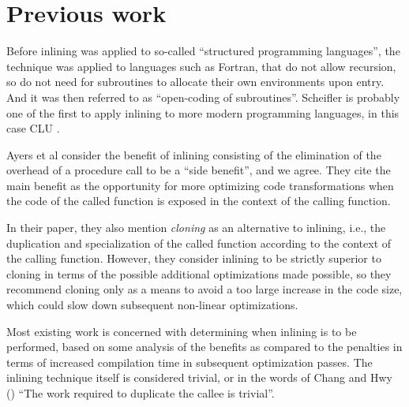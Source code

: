 \section{Previous work}

Before inlining was applied to so-called ``structured programming
languages'', the technique was applied to languages such as Fortran,
that do not allow recursion, so do not need for subroutines to
allocate their own environments upon entry.  And it was then referred
to as ``open-coding of subroutines''.  Scheifler
\cite{Scheifler:1977:AIS:359810.359830} is probably one of the first
to apply inlining to more modern programming languages, in this case
CLU \cite{Liskov:1977:AMC:359763.359789}.

Ayers et al \cite{Ayers:1997:AI:258915.258928} consider the benefit of
inlining consisting of the elimination of the overhead of a procedure
call to be a ``side benefit'', and we agree.  They cite the main
benefit as the opportunity for more optimizing code transformations
when the code of the called function is exposed in the context of the
calling function.

In their paper, they also mention \emph{cloning} as an alternative to
inlining, i.e., the duplication and specialization of the called
function according to the context of the calling function.  However,
they consider inlining to be strictly superior to cloning in terms of
the possible additional optimizations made possible, so they recommend
cloning only as a means to avoid a too large increase in the code
size, which could slow down subsequent non-linear optimizations.

Most existing work is concerned with determining when inlining is to
be performed, based on some analysis of the benefits as compared to
the penalties in terms of increased compilation time in subsequent
optimization passes.  The inlining technique itself is considered
trivial, or in the words of Chang and Hwy
(\cite{Chang:1989:IFE:73141.74840.1, Chang:1989:IFE:74818.74840.2}) ``The
work required to duplicate the callee is trivial''.

